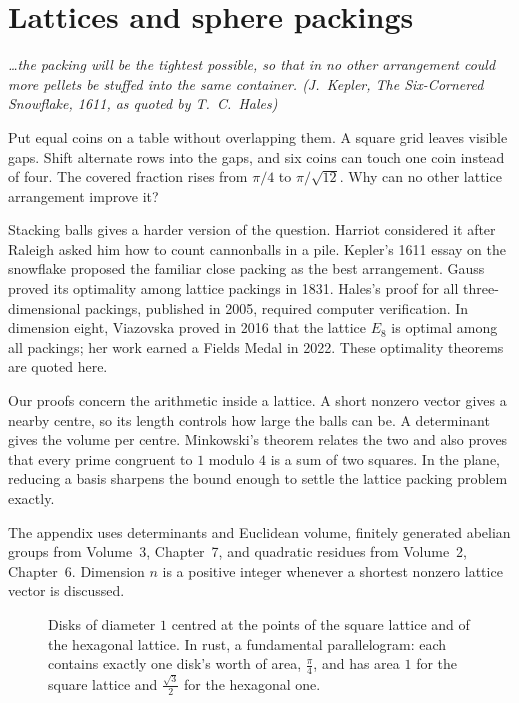 \chapter{Lattices and sphere packings}\label{geometry:ch:lattices}

\begin{center}\itshape
\dots the packing will be the tightest possible, so that in no other arrangement could more pellets be stuffed into the same container.
\upshape(J.~Kepler, \emph{The Six-Cornered Snowflake}, 1611, as quoted by T.~C.~Hales)
\end{center}

Put equal coins on a table without overlapping them. A square grid leaves
visible gaps. Shift alternate rows into the gaps, and six coins can touch
one coin instead of four. The covered fraction rises from $\pi/4$ to
$\pi/\sqrt{12}$. Why can no other lattice arrangement improve it?

Stacking balls gives a harder version of the question. Harriot considered
it after Raleigh asked him how to count cannonballs in a pile. Kepler's
1611 essay on the snowflake proposed the familiar close packing as the
best arrangement. Gauss proved its optimality among lattice packings in
1831. Hales's proof for all three-dimensional packings, published in 2005,
required computer verification. In dimension eight, Viazovska proved in
2016 that the lattice $E_8$ is optimal among all packings; her work earned
a Fields Medal in 2022. These optimality theorems are quoted here.

Our proofs concern the arithmetic inside a lattice. A short nonzero
vector gives a nearby centre, so its length controls how large the balls
can be. A determinant gives the volume per centre. Minkowski's theorem
relates the two and also proves that every prime congruent to $1$ modulo
$4$ is a sum of two squares. In the plane, reducing a basis sharpens the
bound enough to settle the lattice packing problem exactly.

The appendix uses determinants and Euclidean volume, finitely generated
abelian groups from Volume~3, Chapter~7, and quadratic residues from
Volume~2, Chapter~6. Dimension $n$ is a positive integer whenever a shortest
nonzero lattice vector is discussed.

\begin{figure}[ht]
\centering
{}
\caption{Disks of diameter $1$ centred at the points of the square lattice and of the hexagonal lattice. In rust, a fundamental parallelogram: each
contains exactly one disk's worth of area, $\frac\pi4$, and has area $1$ for the square lattice and $\frac{\sqrt3}2$ for the hexagonal one.}
\label{geometry:fig:packings}
\end{figure}

